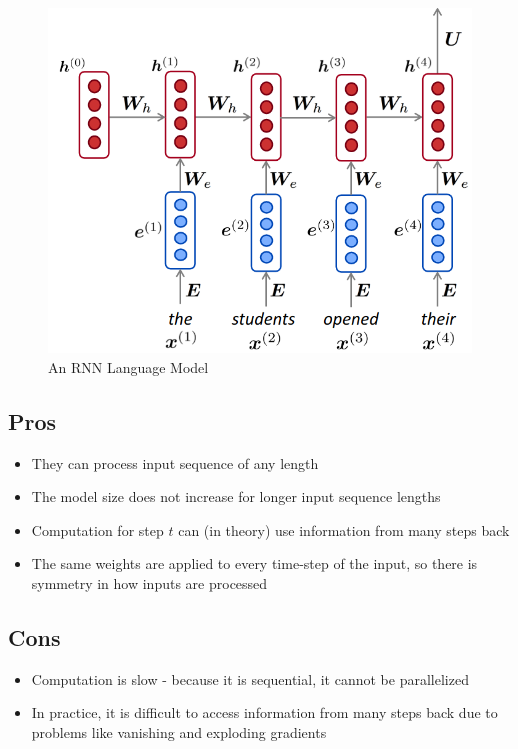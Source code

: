 \documentclass[letterpaper]{article}
\begin{document}
\begin{figure}[ht]
	\includegraphics[scale=0.3]{images/RNN.png}
	\caption{An RNN Language Model}
	\label{fig:rnn}
\end{figure}



\subsection{Pros}
\begin{itemize}
	\item They can process input sequence of any length
	\item The model size does not increase for longer input sequence lengths
	\item Computation for step $t$ can (in theory) use information from many 
	steps back
	\item The same weights are applied to every time-step of the input, so
	there is symmetry in how inputs are processed
\end{itemize}

\subsection{Cons}
\begin{itemize}
	\item Computation is slow - because it is sequential, it cannot be
	parallelized
	\item In practice, it is difficult to access information from many steps
	back due to problems like vanishing and exploding gradients
\end{itemize}
\end{document}
